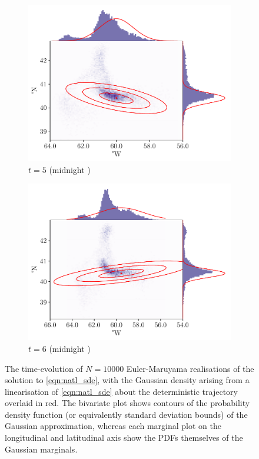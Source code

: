 \begin{figure}
\begin{center}
\begin{subfigure}{0.49\textwidth}
			\includegraphics[width=\textwidth]{chp06_applications/figures/gulf_stream/traj_stoch_em_5.0}
			\caption{\(t = 5\) (midnight )}
		\end{subfigure}
		\begin{subfigure}{0.49\textwidth}
			\includegraphics[width=\textwidth]{chp06_applications/figures/gulf_stream/traj_stoch_em_6.0}
			\caption{\(t = 6\) (midnight )}
		\end{subfigure}
		\caption{The time-evolution of \(N = 10000\) Euler-Maruyama realisations of the solution to \cref{eqn:natl_sde}, with the Gaussian density arising from a linearisation of \cref{eqn:natl_sde} about the deterministic trajectory overlaid in red.
			The bivariate plot shows contours of the probability density function (or equivalently standard deviation bounds) of the Gaussian approximation, whereas each marginal plot on the longitudinal and latitudinal axis show the PDFs themselves of the Gaussian marginals.}
		\label{fig:natl_em}
	\end{center}
\end{figure}


